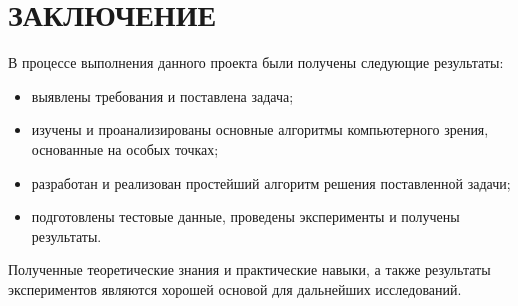 \chapter*{ЗАКЛЮЧЕНИЕ}    

В процессе выполнения данного проекта были получены следующие результаты:

\begin{itemize}
    \item выявлены требования и поставлена задача;
    \item изучены и проанализированы основные алгоритмы компьютерного зрения, основанные на особых точках;
    \item разработан и реализован простейший алгоритм решения поставленной задачи;
    \item подготовлены тестовые данные, проведены эксперименты и получены результаты.
\end{itemize}

Полученные теоретические знания и практические навыки, а также результаты экспериментов являются хорошей основой для дальнейших исследований.

\newpage